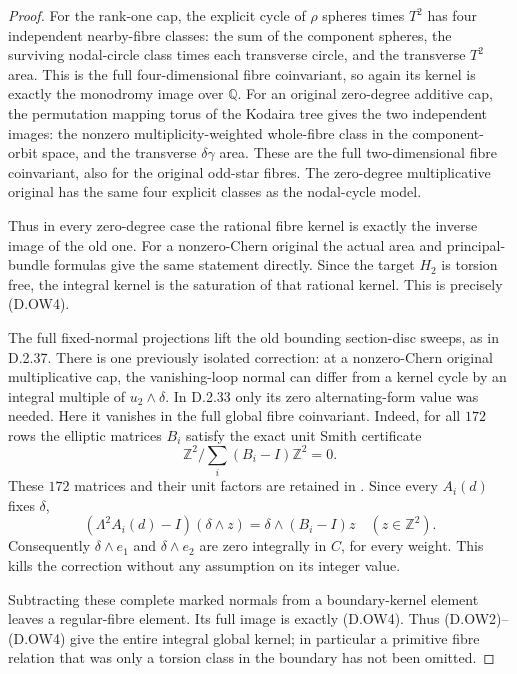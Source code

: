 \begin{proof}
For the rank-one cap, the explicit cycle of
$\rho$ spheres times $T^2$ has four independent
nearby-fibre classes: the sum of the component
spheres, the surviving nodal-circle class times
each transverse circle, and the transverse
$T^2$ area. This is the full four-dimensional
fibre coinvariant, so again its kernel is exactly
the monodromy image over $\mathbb Q$. For an
original zero-degree additive cap, the permutation
mapping torus of the Kodaira tree gives the two
independent images: the nonzero multiplicity-weighted
whole-fibre class in the component-orbit space,
and the transverse $\delta\gamma$ area. These
are the full two-dimensional fibre coinvariant,
also for the original odd-star fibres. The
zero-degree multiplicative original has the same
four explicit classes as the nodal-cycle model.

Thus in every zero-degree case the rational
fibre kernel is exactly the inverse image of
the old one. For a nonzero-Chern original the
actual area and principal-bundle formulas give
the same statement directly. Since the target
$H_2$ is torsion free, the integral kernel is the
saturation of that rational kernel. This is
precisely (D.OW4).

The full fixed-normal projections lift the old
bounding section-disc sweeps, as in D.2.37.
There is one previously isolated correction:
at a nonzero-Chern original multiplicative cap,
the vanishing-loop normal can differ from a
kernel cycle by an integral multiple of
$u_2\wedge\delta$. In D.2.33 only its zero
alternating-form value was needed. Here it
vanishes in the full global fibre coinvariant.
Indeed, for all $172$ rows the elliptic matrices
$B_i$ satisfy the exact unit Smith certificate
\[
       \mathbb Z^2/\sum_i(B_i-I)\mathbb Z^2=0.             \tag{D.OW7}
\]
These $172$ matrices and their unit factors
are retained in
.
Since every $A_i(d)$ fixes $\delta$,
\[
 (\Lambda^2A_i(d)-I)(\delta\wedge z)
                 =\delta\wedge(B_i-I)z
       \quad(z\in\mathbb Z^2).
\]
Consequently $\delta\wedge e_1$ and
$\delta\wedge e_2$ are zero integrally in $C$,
for every weight. This kills the correction
without any assumption on its integer value.

Subtracting these complete marked normals
from a boundary-kernel element leaves a
regular-fibre element. Its full image is
exactly (D.OW4). Thus (D.OW2)--(D.OW4)
give the entire integral global kernel;
in particular a primitive fibre relation
that was only a torsion class in the boundary
has not been omitted.


\end{proof}
